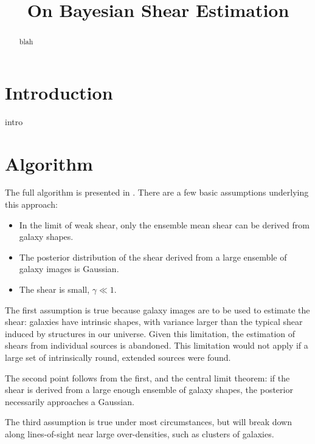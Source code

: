 \documentclass[12pt,preprint]{aastex}
\begin{document}
\title{On Bayesian Shear Estimation}



\begin{abstract}

blah

\end{abstract}

\section{Introduction} \label{sec:intro}

intro

\section{Algorithm} \label{sec:algo}

The full algorithm is presented in \citet[][BA13]{ba13}.  There are a few basic
assumptions underlying this approach:

\begin{itemize}

    \item In the limit of weak shear, only the ensemble mean shear can be
        derived from galaxy shapes.

    \item The posterior distribution of the shear derived from a large ensemble
        of galaxy images is Gaussian.

    \item The shear is small, $\gamma \ll 1$.

\end{itemize}

The first assumption is true because galaxy images are to be used to estimate
the shear: galaxies have intrinsic shapes, with variance larger than the
typical shear induced by structures in our universe. Given this limitation, the
estimation of shears from individual sources is abandoned.  This limitation
would not apply if a large set of intrinsically round, extended sources were
found.

The second point follows from the first, and the central limit theorem: if the
shear is derived from a large enough ensemble of galaxy shapes, the posterior
necessarily approaches a Gaussian.

The third assumption is true under most circumstances, but will break down
along lines-of-sight near large over-densities, such as clusters of galaxies.
\end{document}
